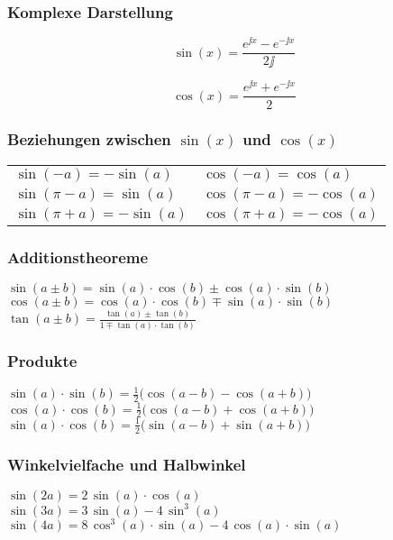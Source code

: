\subsubsection{Komplexe Darstellung}
		
\begin{minipage}{0.48\linewidth}
$$ \sin(x) = \frac{e^{\jj x} - e^{-\jj x}}{2\jj } $$ 
\end{minipage}	
\hfill
\begin{minipage}{0.48\linewidth}
$$ \cos(x) = \frac{e^{\jj x} + e^{-\jj x}}{2} $$ 
\end{minipage}		



\subsubsection{Beziehungen zwischen $\sin(x)$ und $\cos(x)$}
\begin{tabular}{ll}
$\sin(-a) = -\sin(a)$ & $\cos(-a) = \cos(a)$ \\
$\sin(\pi - a) = \sin(a)$ & $\cos(\pi -a) = - \cos(a)$ \\		
$\sin(\pi + a) = -\sin(a)$ & $\cos(\pi + a) = - \cos(a)$ \\	
\end{tabular}


\subsubsection{Additionstheoreme}

$\sin(a \pm b) = \sin(a) \cdot \cos(b) \pm \cos(a) \cdot \sin(b)$ \\
$\cos(a \pm b) = \cos(a) \cdot \cos(b) \mp \sin(a) \cdot \sin(b) $ \\
$\tan(a \pm b) = \frac{\tan(a) \pm \tan(b)}{1 \mp \tan(a) \cdot \tan(b)}$

\subsubsection{Produkte}
$\sin(a) \cdot \sin(b) = \frac{1}{2} \big( \cos(a-b) - \cos(a+b) \big) $ \\
$\cos(a) \cdot \cos(b) = \frac{1}{2} \big( \cos(a-b) + \cos(a+b) \big) $ \\	
$\sin(a) \cdot \cos(b) = \frac{1}{2} \big( \sin(a-b) + \sin(a+b) \big) $
  
\subsubsection{Winkelvielfache und Halbwinkel}
$\sin(2a) = 2 \, \sin(a) \cdot \cos(a)$ \\
$\sin(3a) = 3 \, \sin(a) -4 \, \sin^3(a)$ \\ 
$\sin(4a) = 8 \, \cos^3(a) \cdot \sin(a) - 4 \, \cos(a) \cdot \sin(a)$

